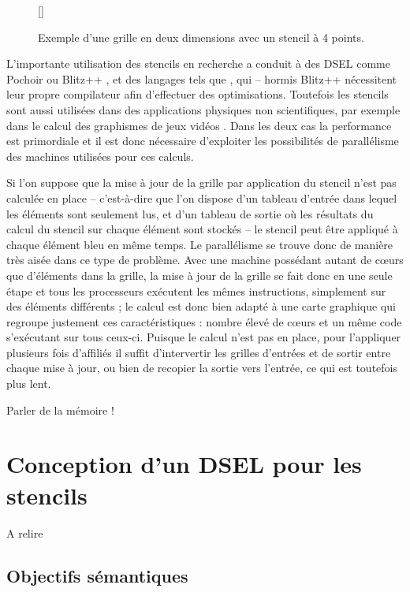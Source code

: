 \begin{figure}[!bp]
[\FBwidth]
{\caption{Exemple d'une grille en deux dimensions avec un stencil à 4 points.}\label{fig:stencil_base}}
{}
\end{figure}

L'importante utilisation des stencils en recherche a conduit à des DSEL comme \textsf{Pochoir} \cite{Art18} ou  \textsf{Blitz++} \cite{Art5}, et des langages tels que \cite{Art19}, qui -- hormis \textsf{Blitz++} nécessitent leur propre compilateur afin d'effectuer des optimisations. Toutefois les stencils sont aussi utilisées dans des applications physiques non scientifiques, par exemple dans le calcul des graphismes de jeux vidéos \cite{Art15}. Dans les deux cas la performance est primordiale et il est donc nécessaire d'exploiter les possibilités de parallélisme des machines utilisées pour ces calculs.  

Si l'on suppose que la mise à jour de la grille par application du stencil n'est pas calculée en place -- c'est-à-dire que l'on dispose d'un tableau d'entrée dans lequel les éléments sont seulement lus, et d'un tableau de sortie où les résultats du calcul du stencil sur chaque élément sont stockés -- le stencil peut être appliqué à chaque élément bleu en même temps. Le parallélisme se trouve donc de manière très aisée dans ce type de problème. Avec une  machine possédant autant de cœurs que d'éléments dans la grille, la mise à jour de la grille se fait donc en une seule étape et tous les processeurs exécutent les mêmes instructions, simplement sur des éléments différents ; le calcul est donc bien adapté à une carte graphique qui regroupe justement ces caractéristiques : nombre élevé de cœurs et un même code s'exécutant sur tous ceux-ci. Puisque le calcul n'est pas en place, pour l'appliquer plusieurs fois d'affiliés il suffit d'intervertir les grilles d'entrées et de sortir entre chaque mise à jour, ou bien de recopier la sortie vers l'entrée, ce qui est toutefois plus lent.



Parler de la mémoire !


\section{Conception d'un DSEL pour les stencils}

A relire \cite{Art22}

\subsection{Objectifs sémantiques}

